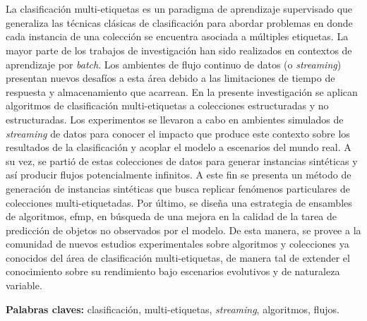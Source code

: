 \chapter*{\runtitulo}

\noindent La clasificación multi-etiquetas es un paradigma de aprendizaje
supervisado que generaliza las técnicas clásicas de clasificación para abordar
problemas en donde cada instancia de una colección se encuentra asociada a
múltiples etiquetas. La mayor parte de los trabajos de investigación han sido
realizados en contextos de aprendizaje por \textit{batch}. Los ambientes de
flujo continuo de datos  (o \textit{streaming}) presentan nuevos desafíos a esta
área debido a las limitaciones de tiempo de respuesta y almacenamiento que
acarrean. En la presente investigación se aplican algoritmos de clasificación
multi-etiquetas a colecciones estructuradas y no estructuradas. Los experimentos
se llevaron a cabo en ambientes simulados de \textit{streaming} de datos para
conocer el impacto que produce este contexto sobre los resultados de la
clasificación y acoplar el modelo a escenarios del mundo real. A su vez, se
partió de estas colecciones de datos para generar instancias sintéticas y así
producir flujos potencialmente infinitos. A este fin se presenta un método de
generación de instancias sintéticas que busca replicar fenómenos particulares de
colecciones multi-etiquetadas. Por último, se diseña una estrategia de ensambles
de algoritmos, \acrshort{efmp}, en búsqueda de una mejora en la calidad de la
tarea de predicción de objetos no observados por el modelo. De esta manera, se
provee a la comunidad de nuevos estudios experimentales sobre algoritmos y
colecciones ya conocidos del área de clasificación multi-etiquetas, de manera
tal de extender el conocimiento sobre su rendimiento bajo escenarios evolutivos
y de naturaleza variable.

\bigskip

\noindent\textbf{Palabras claves:} clasificación, multi-etiquetas, \textit{streaming}, algoritmos, flujos.
